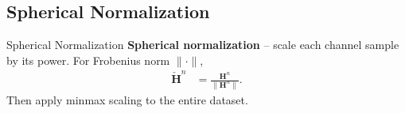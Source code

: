 \documentclass{beamer}
\newcommand{\fignocap}[2]{
	\begin{figure}[!hbtp]
	    \centering
		\texttt{[image: \#2]}
	\end{figure}
}
\begin{document}


\subsection{Spherical Normalization}
  \begin{frame}{Spherical Normalization}
    \textbf{Spherical normalization} -- scale each channel sample by its power. For Frobenius norm $\|\cdot\|$,
    \begin{align}
      \mathbf{\check H}^n &= \frac{\mathbf H^n}{\|\mathbf H^n\|}. \label{eq:sph-intro}
    \end{align}
    Then apply minmax scaling to the entire dataset.
  \end{frame}
\end{document}
